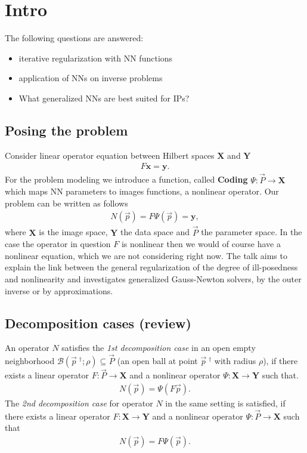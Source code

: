 




\maketitle

\tableofcontents

\section{Intro}
The following questions are answered:
\begin{itemize}
    \item iterative regularization with NN functions
    \item application of NNs on inverse problems
    \item What generalized NNs are best suited for IPs?
\end{itemize}

\subsection{Posing the problem}
Consider linear operator equation between Hilbert spaces $\mathbf{X}$ and
$\mathbf{Y}$
\begin{align}
    F\mathbf{x} = \mathbf{y}.
\end{align}
For the problem modeling we introduce a function, called \textbf{Coding}
$\Psi: \vec{P} \to \mathbf{X}$ which maps NN parameters to images functions,
a nonlinear operator. Our problem can be written as follows
\begin{align}
    N(\vec{p}) = F\Psi(\vec{p}) = \mathbf{y},
\end{align}
where $\mathbf{X}$ is the image space, $\mathbf{Y}$ the data space and $\vec{P}$ the parameter
space. In the case the operator in question $F$ is nonlinear then we would of
course have a nonlinear equation, which we are not considering right now. The
talk aims to explain the link between the general regularization of the
degree of ill-posedness and nonlinearity and investigates generalized
Gauss-Newton solvers, by the outer inverse or by approximations.
\subsection{Decomposition cases (review)}
An operator $N$ satisfies the \textit{1st decomposition case} in an open empty
neighborhood $\mathcal{B}\left(\vec{p}\;^{\dagger}; \rho \right) \subseteq
\vec{P} $ (an open ball at point $\vec{p}\;^{\dagger}$ with radius $\rho$), if
there exists a linear operator $F:\vec{P}\to \mathbf{X}$ and a nonlinear
operator $\Psi:\mathbf{X} \to \mathbf{Y}$ such that.
\begin{align}
    N(\vec{p}) = \Psi(F\vec{p}).
\end{align}
The \textit{2nd decomposition case} for operator $N$ in the same setting is
satisfied, if there exists a linear operator $F: \mathbf{X} \to \mathbf{Y}$
and a nonlinear operator $\Psi: \vec{P} \to \mathbf{X}$ such that
\begin{align}
    N(\vec{p}) = F\Psi(\vec{p}).
\end{align}
